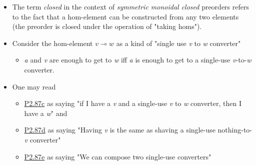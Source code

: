 \begin{itemize}
    \item  The term \emph{closed} in the context of \emph{symmetric monoidal closed} preorders refers to the fact that a hom-element can be constructed from any two elements (the preorder is closed under the operation of "taking homs").
    \item Consider the hom-element $v \multimap w$ as a kind of "single use \emph{v} to \emph{w} converter"
          \begin{itemize}
            \item \emph{a} and \emph{v} are enough to get to \emph{w} iff \emph{a} is enough to get to a single-use \emph{v}-to-\emph{w} converter.
          \end{itemize}
    \item One may read
          \begin{itemize}
            \item \hyperref[P2.87]{P2.87c} as saying "if I have a \emph{v} and a single-use \emph{v} to \emph{w} converter, then I have a \emph{w}" and
            \item \hyperref[P2.87]{P2.87d} as saying "Having \emph{v} is the same as shaving a single-use nothing-to-\emph{v} converter"
            \item \hyperref[P2.87]{P2.87e} as saying "We can compose two single-use converters"
          \end{itemize}
  \end{itemize}
